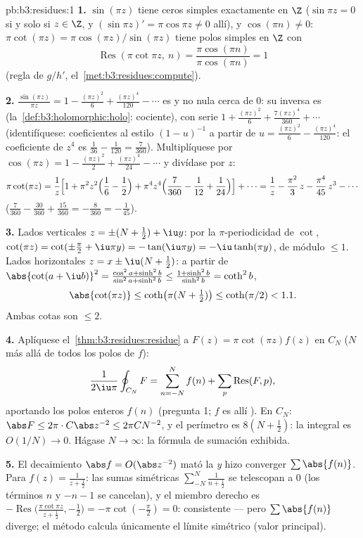 \begin{solution}{pb:b3:residues:1}
\textbf{1.} $\sin(\pi z)$ tiene ceros simples exactamente en $\Z$
($\sin\pi z = 0$ si y solo si $z \in \Z$, y $(\sin\pi z)' = \pi\cos\pi
z \neq 0$ allí), y $\cos(\pi n) \neq 0$: $\pi\cot(\pi z) =
\pi\cos(\pi z)/\sin(\pi z)$ tiene polos simples en $\Z$ con
\[
\operatorname{Res}(\pi\cot\pi z,\ n)
= \frac{\pi\cos(\pi n)}{\pi\cos(\pi n)} = 1
\]
(regla de $g/h'$, el~\cref{met:b3:residues:compute}).

\textbf{2.} $\frac{\sin(\pi z)}{\pi z} = 1 - \frac{(\pi z)^2}6
+ \frac{(\pi z)^4}{120} - \cdots$ es
 y no nula cerca de $0$: su
inversa es 
(la~\cref{def:b3:holomorphic:holo}: cociente), con serie $1 +
\frac{(\pi z)^2}{6} + \frac{7(\pi z)^4}{360} + \cdots$ (identifíquese:
coeficientes al estilo $(1 - u)^{-1}$ a partir de $u =
\frac{(\pi z)^2}6 - \frac{(\pi z)^4}{120}$: el coeficiente de $z^4$ es
$\frac1{36} - \frac1{120} = \frac{7}{360}$). Multiplíquese por
$\cos(\pi z) = 1 - \frac{(\pi z)^2}2 + \frac{(\pi
z)^4}{24} - \cdots$ y divídase por $z$:
\[
\pi\cot(\pi z) = \frac1z\Bigl[1 + \pi^2z^2\Bigl(\frac16 -
\frac12\Bigr) + \pi^4z^4\Bigl(\frac7{360} - \frac1{12} +
\frac1{24}\Bigr)\Bigr] + \cdots
= \frac1z - \frac{\pi^2}3\,z - \frac{\pi^4}{45}\,z^3 -
\cdots
\]
($\frac7{360} - \frac{30}{360} + \frac{15}{360} =
-\frac8{360} = -\frac1{45}$).

\textbf{3.} Lados verticales $z = \pm(N + \frac12) + \iu y$: por la
$\pi$-periodicidad de $\cot$, $\cot(\pi z) = \cot(\pm\frac\pi2
+ \iu\pi y) = -\tan(\iu\pi y) = -\iu\tanh(\pi y)$, de módulo $\leq 1$.
Lados horizontales $z = x \pm \iu(N + \frac12)$: a partir de
$\abs{\cot(a + \iu b)}^2 = \frac{\cos^2a +
\sinh^2b}{\sin^2a + \sinh^2b} \leq \frac{1 +
\sinh^2b}{\sinh^2b} = \coth^2 b$,
\[
\abs{\cot(\pi z)} \leq \coth\bigl(\pi(N + \tfrac12)\bigr)
\leq \coth(\pi/2) < 1.1 .
\]
Ambas cotas son $\leq 2$.

\textbf{4.} Aplíquese el~\cref{thm:b3:residues:residue} a $F(z) =
\pi\cot(\pi z)f(z)$ en $C_N$ ($N$ más allá de todos los polos de $f$):
\[
\frac1{2\iu\pi}\oint_{C_N}F = \sum_{n=-N}^{N}f(n) +
\sum_p\operatorname{Res}(F, p),
\]
aportando los polos enteros $f(n)$ (pregunta 1; $f$ es allí
). En $C_N$:
$\abs F \leq 2\pi\cdot
C\abs z^{-2} \leq 2\pi C N^{-2}$, y el perímetro es $8(N +
\frac12)$: la integral es $O(1/N) \to 0$. Hágase $N \to
\infty$: la fórmula de sumación exhibida.

\textbf{5.} El decaimiento $\abs f = O(\abs z^{-2})$ mató la
 \emph{y} hizo
converger $\sum\abs{f(n)}$. Para $f(z) = \frac1{z + \frac12}$: las sumas
simétricas $\sum_{-N}^N\frac1{n + \frac12}$ se telescopan a $0$ (los
términos $n$ y $-n - 1$ se cancelan), y el miembro derecho es
$-\operatorname{Res}\bigl(\frac{\pi\cot\pi z}{z + \frac12},
-\frac12\bigr) = -\pi\cot(-\frac\pi2) = 0$: consistente --- pero
$\sum\abs{f(n)}$ diverge; el método calcula únicamente el límite
simétrico (valor principal).


\end{solution}
